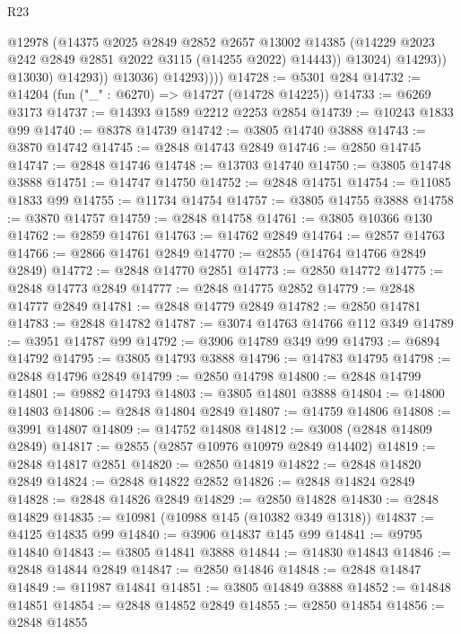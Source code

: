 \begin{lexlean}{R23}
\begin{coremodule}
                          @12978
                          (@14375
                            @2025
                            @2849
                            @2852
                            @2657
                            @13002
                            @14385
                            (@14229 @2023 @242 @2849 @2851 @2022 @3115 (@14255 @2022) @14443))
                          @13024)
                        @14293))
                    @13030)
                  @14293))
              @13036)
            @14293))))
@14728 := @5301 @284
@14732 := @14204 (fun ("_" : @6270) => @14727 (@14728 @14225))
@14733 := @6269 @3173
@14737 := @14393 @1589 @2212 @2253 @2854
@14739 := @10243 @1833 @99
@14740 := @8378 @14739
@14742 := @3805 @14740 @3888
@14743 := @3870 @14742
@14745 := @2848 @14743 @2849
@14746 := @2850 @14745
@14747 := @2848 @14746
@14748 := @13703 @14740
@14750 := @3805 @14748 @3888
@14751 := @14747 @14750
@14752 := @2848 @14751
@14754 := @11085 @1833 @99
@14755 := @11734 @14754
@14757 := @3805 @14755 @3888
@14758 := @3870 @14757
@14759 := @2848 @14758
@14761 := @3805 @10366 @130
@14762 := @2859 @14761
@14763 := @14762 @2849
@14764 := @2857 @14763
@14766 := @2866 @14761 @2849
@14770 := @2855 (@14764 @14766 @2849 @2849)
@14772 := @2848 @14770 @2851
@14773 := @2850 @14772
@14775 := @2848 @14773 @2849
@14777 := @2848 @14775 @2852
@14779 := @2848 @14777 @2849
@14781 := @2848 @14779 @2849
@14782 := @2850 @14781
@14783 := @2848 @14782
@14787 := @3074 @14763 @14766 @112 @349
@14789 := @3951 @14787 @99
@14792 := @3906 @14789 @349 @99
@14793 := @6894 @14792
@14795 := @3805 @14793 @3888
@14796 := @14783 @14795
@14798 := @2848 @14796 @2849
@14799 := @2850 @14798
@14800 := @2848 @14799
@14801 := @9882 @14793
@14803 := @3805 @14801 @3888
@14804 := @14800 @14803
@14806 := @2848 @14804 @2849
@14807 := @14759 @14806
@14808 := @3991 @14807
@14809 := @14752 @14808
@14812 := @3008 (@2848 @14809 @2849)
@14817 := @2855 (@2857 @10976 @10979 @2849 @14402)
@14819 := @2848 @14817 @2851
@14820 := @2850 @14819
@14822 := @2848 @14820 @2849
@14824 := @2848 @14822 @2852
@14826 := @2848 @14824 @2849
@14828 := @2848 @14826 @2849
@14829 := @2850 @14828
@14830 := @2848 @14829
@14835 := @10981 (@10988 @145 (@10382 @349 @1318))
@14837 := @4125 @14835 @99
@14840 := @3906 @14837 @145 @99
@14841 := @9795 @14840
@14843 := @3805 @14841 @3888
@14844 := @14830 @14843
@14846 := @2848 @14844 @2849
@14847 := @2850 @14846
@14848 := @2848 @14847
@14849 := @11987 @14841
@14851 := @3805 @14849 @3888
@14852 := @14848 @14851
@14854 := @2848 @14852 @2849
@14855 := @2850 @14854
@14856 := @2848 @14855

\end{coremodule}
\end{lexlean}
